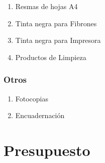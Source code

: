 		\begin{enumerate}
		\item Resmas de hojas A4
		\item Tinta negra para Fibrones
		\item Tinta negra para Impresora
		\item Productos de Limpieza
		\end{enumerate}

	 	\subsubsection{Otros}
		\begin{enumerate}
		
		 \item Fotocopias
		 \item Encuadernación
		
		\end{enumerate}			 	
	 	
	 
\section{Presupuesto}

